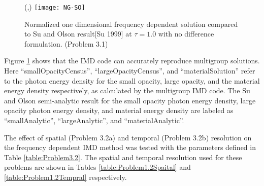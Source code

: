 \begin{figure}[htbp]
	\begin{center}
		\begin{minipage}[t]{6in}
		\centering
		\begin{picture}(\width,\height)
	                {\texttt{[image: NG-SO]}}
		\end{picture}
		\caption{\label{fig:NG-SO} Normalized one dimensional frequency dependent solution compared to Su and Olson result[Su 1999] at $\tau=1.0$ with no difference formulation. (Problem 3.1)}
		\end{minipage} %
	\end{center}
\end{figure}

 	Figure \ref{fig:NG-SO} shows that the IMD code can accurately reproduce multigroup solutions. Here ``smallOpacityCensus'', ``largeOpacityCensus'', and ``materialSolution'' refer to the photon energy density for the small opacity, large opacity, and the material energy density respectively, as calculated by the multigroup IMD code. The Su and Olson semi-analytic result for the small opacity photon energy density, large opacity photon energy density, and material energy density are labeled as ``smallAnalytic'', ``largeAnalytic'', and ``materialAnalytic''.

	The effect of spatial (Problem 3.2a) and temporal (Problem 3.2b) resolution on the frequency dependent IMD method was tested with the parameters defined in Table \ref{table:Problem3.2}. The spatial and temporal resolution used for these problems are shown in Tables \ref{table:Problem1.2Spaital} and \ref{table:Problem1.2Tempral} respectively.

